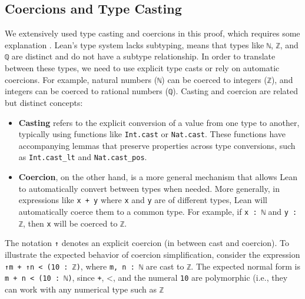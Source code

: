 \subsection{Coercions and Type Casting}
We extensively used type casting and coercions in this proof, which requires some
explanation \cite{lewis_madelaine_simplifying_casts_coercions_2020}.
Lean's type system lacks subtyping, means that types
like \lstinline[language=lean]|ℕ|, \lstinline[language=lean]|ℤ|, and \lstinline[language=lean]|ℚ|
are distinct and do not have a subtype relationship. In order to translate between these types,
we need to use explicit type casts or rely on automatic coercions. For example,
natural numbers (\lstinline[language=lean]|ℕ|) can be coerced to integers (\lstinline[language=lean]|ℤ|),
and integers can be coerced to rational numbers (\lstinline[language=lean]|ℚ|).
Casting and coercion are related but distinct concepts:
\begin{itemize}
  \item \textbf{Casting} refers to the explicit conversion of a value from one type to another,
        typically using functions like \lstinline[language=lean]|Int.cast| or \lstinline[language=lean]|Nat.cast|.
        These functions have accompanying lemmas that preserve properties across type conversions,
        such as \lstinline[language=lean]|Int.cast_lt| and \lstinline[language=lean]|Nat.cast_pos|.
  \item \textbf{Coercion}, on the other hand, is a more general mechanism that allows
        Lean to automatically convert between types when needed.
        More generally, in expressions like \lstinline[language=lean]|x + y| where \lstinline[language=lean]|x|
        and \lstinline[language=lean]|y| are of different types,
        Lean will automatically coerce them to a common type. For example, if \lstinline[language=lean]|x : ℕ|
        and \lstinline[language=lean]|y : ℤ|, then \lstinline[language=lean]|x|
        will be coerced to \lstinline[language=lean]|ℤ|.
\end{itemize}
The notation \lstinline[language=lean]|↑| denotes an explicit coercion
(in between cast and coercion).
To illustrate the expected behavior of coercion simplification, consider
the expression \lstinline[language=lean]|↑m + ↑n < (10 : ℤ)|,
where \lstinline[language=lean]|m, n : ℕ| are cast to \lstinline[language=lean]|ℤ|.
The expected normal form is \lstinline[language=lean]|m + n < (10 : ℕ)|,
since \lstinline[language=lean]|+|,
<,
and the numeral \lstinline[language=lean]|10| are polymorphic
(i.e., they can work with any numerical type such as \lstinline[language=lean]|ℤ|

